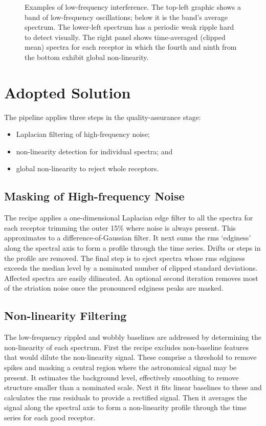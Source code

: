 \documentclass[11pt,twoside]{article}
\begin{document}
\begin{figure}[!ht]
\caption{Examples of low-frequency interference.  The top-left 
graphic shows a band of low-frequency oscillations; below it is the 
band's average spectrum.  The lower-left spectrum has a periodic weak
ripple hard to detect visually.  The right panel shows time-averaged
(clipped mean) spectra for each receptor in which the fourth and ninth
from the bottom exhibit global non-linearity.}
\end{figure}

\section{Adopted Solution}

The pipeline applies three steps in the quality-assurance stage: 
\begin{itemize}
\item Laplacian filtering of high-frequency noise;
\item non-linearity detection for individual spectra; and
\item global non-linearity to reject whole receptors.
\end{itemize}

\subsection{Masking of High-frequency Noise}
 
The recipe applies a one-dimensional Laplacian edge filter to all the
spectra for each receptor trimming the outer 15\% where noise is
always present.  This approximates to a difference-of-Gaussian filter.
It next sums the rms `edginess' along the spectral axis to form a
profile through the time series.  Drifts or steps in the profile are
removed.  The final step is to eject spectra whose rms edginess
exceeds the median level by a nominated number of clipped standard
deviations.  Affected spectra are easily dilineated.  An optional
second iteration removes most of the striation noise once the
pronounced edginess peaks are masked.

\subsection{Non-linearity Filtering}

The low-frequency rippled and wobbly baselines are addressed by 
determining the non-linearity of each spectrum.  First the recipe
excludes non-baseline features that would dilute the non-linearity
signal.  These comprise a threshold to remove spikes and masking a
central region where the astronomical signal may be present. It
estimates the background level, effectively smoothing to remove
structure smaller than a nominated scale.  Next it fits linear
baselines to these and calculates the rms residuals to provide a
rectified signal.  Then it averages the signal along the spectral axis
to form a non-linearity profile through the time series for each
good receptor.
\end{document}
